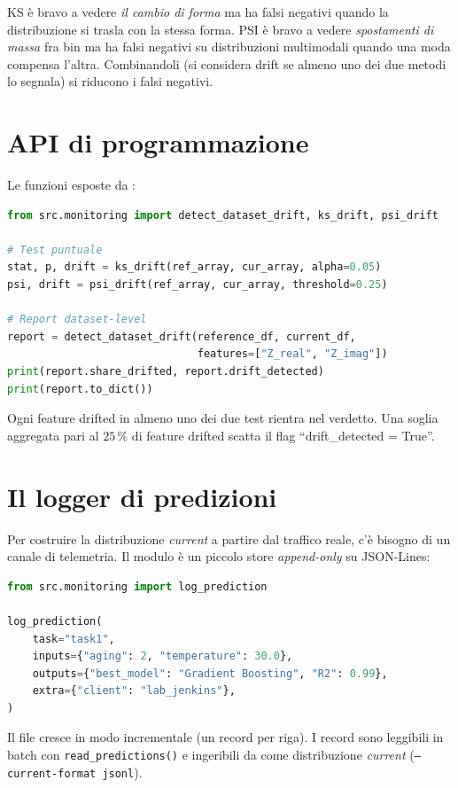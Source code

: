 KS è bravo a vedere \emph{il cambio di forma} ma ha falsi negativi quando
la distribuzione si trasla con la stessa forma. PSI è bravo a vedere
\emph{spostamenti di massa} fra bin ma ha falsi negativi su distribuzioni
multimodali quando una moda compensa l'altra. Combinandoli (si considera drift se almeno uno dei due metodi lo segnala) si riducono i falsi negativi.

\newpage
\section{API di programmazione}

Le funzioni esposte da :

\begin{lstlisting}[language=Python]
from src.monitoring import detect_dataset_drift, ks_drift, psi_drift

# Test puntuale
stat, p, drift = ks_drift(ref_array, cur_array, alpha=0.05)
psi, drift = psi_drift(ref_array, cur_array, threshold=0.25)

# Report dataset-level
report = detect_dataset_drift(reference_df, current_df,
                              features=["Z_real", "Z_imag"])
print(report.share_drifted, report.drift_detected)
print(report.to_dict())
\end{lstlisting}

Ogni feature drifted in almeno uno dei due test rientra nel verdetto.
Una soglia aggregata pari al $25\,\%$ di feature drifted scatta il flag
``drift\_detected = True''.

\section{Il logger di predizioni}

Per costruire la distribuzione \emph{current} a partire dal traffico
reale, c'è bisogno di un canale di telemetria. Il modulo
 è un piccolo store
\emph{append-only} su JSON-Lines:

\begin{lstlisting}[language=Python]
from src.monitoring import log_prediction

log_prediction(
    task="task1",
    inputs={"aging": 2, "temperature": 30.0},
    outputs={"best_model": "Gradient Boosting", "R2": 0.99},
    extra={"client": "lab_jenkins"},
)
\end{lstlisting}

Il file  cresce in modo incrementale (un
record per riga). I record sono leggibili in batch con
\texttt{read\_predictions()} e ingeribili da 
come distribuzione \emph{current} (\texttt{--current-format jsonl}).


